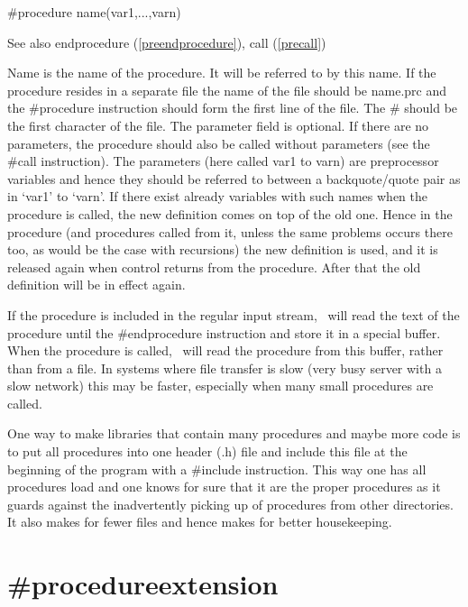 \#procedure name(var1,...,varn)
 
\noindent See also endprocedure (\ref{preendprocedure}), call
(\ref{precall})

\noindent Name is the name of the 
procedure. It will be referred to by this name. If the 
procedure resides in a separate file the name of the file should be 
name.prc and the \#procedure instruction should form the first line of the 
file. The \# should be the first character of the file. The parameter field 
is optional. If there are no parameters, the procedure should also be 
called without parameters (see the \#call instruction). The parameters 
(here called var1 to varn) are preprocessor variables and hence they should 
be referred to between a backquote/quote pair 
as in `var1' to `varn'. If there exist already variables with such names 
when the procedure is called, the new definition comes on top of the old 
one. Hence in the procedure (and procedures called from it, unless the same 
problems occurs there too, as would be the case with recursions) the new 
definition is used, and it is released again when control returns from the 
procedure. After that the old definition will be in effect again.

If the procedure is included in the regular input stream, \FORM\ will read 
the text of the procedure until the \#endprocedure 
instruction and store it in a special buffer. When the procedure is called, 
\FORM\ will read the procedure from this buffer, rather than from a file. In 
systems where file transfer is slow (very busy server with a slow network) 
this may be faster, especially when many small procedures are called.

One way to make libraries that 
contain many procedures and maybe more code is to put all procedures into 
one header (.h) file and include this file at the beginning of the program 
with a \#include instruction. This way one has all 
procedures load and one knows for sure that it are the proper procedures as 
it guards against the inadvertently picking up of procedures from other 
directories. It also makes for fewer files and hence makes for better 
housekeeping.



\section{\#procedureextension}
\label{preprocedureextension}

